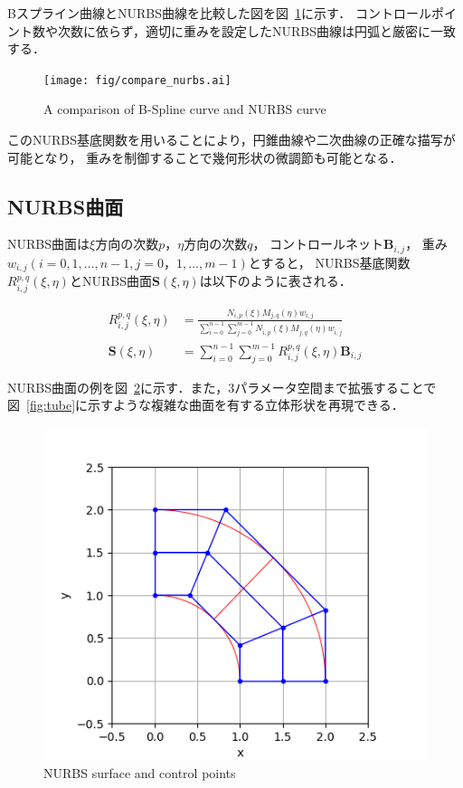 \newpage

Bスプライン曲線とNURBS曲線を比較した図を図~\ref{fig:compare nurbs}に示す．
コントロールポイント数や次数に依らず，適切に重みを設定したNURBS曲線は円弧と厳密に一致する．

\begin{figure}[htbp]
  \centering
  \texttt{[image: fig/compare\_nurbs.ai]}
  \caption{A comparison of B-Spline curve and NURBS curve}
  \label{fig:compare nurbs}
\end{figure}

\noindent
このNURBS基底関数を用いることにより，円錐曲線や二次曲線の正確な描写が可能となり，
重みを制御することで幾何形状の微調節も可能となる．

\subsection{NURBS曲面}
NURBS曲面は$\xi$方向の次数$p$，$\eta$方向の次数$q$，
コントロールネット$\boldsymbol{B}_{i,j}$，
重み$w_{i,j} (i=0, 1, \dots, n-1,  j=0，1, \dots, m-1)$とすると，
NURBS基底関数$R^{p,q}_{i,j}(\xi, \eta)$とNURBS曲面$\boldsymbol{S}(\xi, \eta)$は以下のように表される．

\begin{align}
  \label{NURBS basis function}
  R^{p,q}_{i,j}(\xi, \eta)&=\frac{N_{i,p}(\xi)M_{j,q}(\eta)w_{i,j}}{\sum_{\hat{i}=0}^{n-1}\sum_{\hat{j}=0}^{m-1}N_{\hat{i},p}(\xi)M_{\hat{j},q}(\eta)w_{\hat{i},\hat{j}}}\\
  \boldsymbol{S}(\xi, \eta)&=\sum_{i=0}^{n-1}\sum_{j=0}^{m-1}R^{p,q}_{i,j}(\xi, \eta)\boldsymbol{B}_{i,j}
\end{align}

NURBS曲面の例を図~\ref{fig:nurbs surface}に示す．また，3パラメータ空間まで拡張することで図~\ref{fig:tube}に示すような複雑な曲面を有する立体形状を再現できる．

\begin{figure}[htbp]
  \centering
  \includegraphics[keepaspectratio, scale = 1.0]
  {fig/png/09.png}
  \caption{NURBS surface and control points}
  \label{fig:nurbs surface}
\end{figure}


